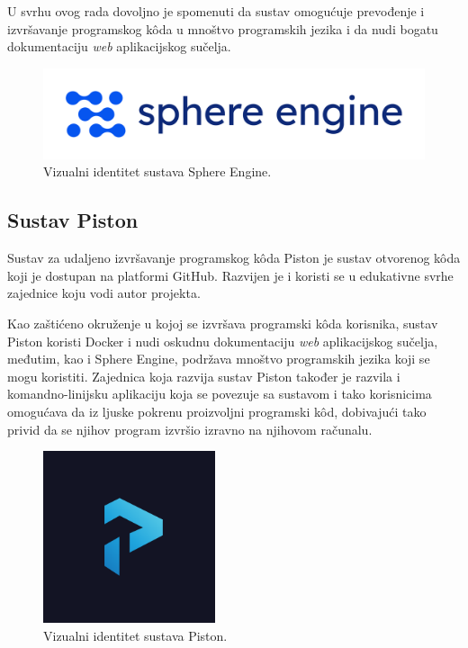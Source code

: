 \documentclass[times, utf8, diplomski]{fer}
\begin{document}
U svrhu ovog rada dovoljno je spomenuti da sustav omogućuje prevođenje i izvršavanje programskog kôda u mnoštvo programskih jezika i da nudi bogatu dokumentaciju \textit{web} aplikacijskog sučelja.

\begin{figure}[htb]
	\centering
	\includegraphics[width=\textwidth]{images/Sphere Engine Logo.png}
	\caption{
	    Vizualni identitet sustava Sphere Engine. \citep{SphereEngine}
	}
\end{figure}

\subsection{Sustav Piston}
Sustav za udaljeno izvršavanje programskog kôda Piston \citep{Piston} je sustav otvorenog kôda koji je dostupan na platformi GitHub. Razvijen je i koristi se u edukativne svrhe zajednice koju vodi autor projekta.

Kao zaštićeno okruženje u kojoj se izvršava programski kôda korisnika, sustav Piston koristi Docker i nudi oskudnu dokumentaciju \textit{web} aplikacijskog sučelja, međutim, kao i Sphere Engine, podržava mnoštvo programskih jezika koji se mogu koristiti. Zajednica koja razvija sustav Piston također je razvila i komandno-linijsku aplikaciju koja se povezuje sa sustavom i tako korisnicima omogućava da iz ljuske  pokrenu proizvoljni programski kôd, dobivajući tako privid da se njihov program izvršio izravno na njihovom računalu.

\begin{figure}[htb]
	\centering
	\includegraphics[width=0.45\textwidth]{images/Piston Logo.png}
	\caption{
	    Vizualni identitet sustava Piston. \citep{Piston}
	}
\end{figure}
\end{document}
